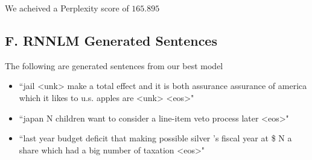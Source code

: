 \documentclass{article}
\begin{document}
We acheived a Perplexity score of $165.895$

\subsection*{F. \textbf{RNNLM} Generated Sentences }
The following are generated sentences from our best model
\begin{itemize}
\item ``jail <unk> make a total effect and it is both assurance assurance of america which it likes to u.s. apples are <unk> <eos>"
\item ``japan N children want to consider a line-item veto process later <eos>"
\item ``last year budget deficit that making possible silver 's fiscal year at \$ N a share which had a big number of taxation <eos>"
\end{itemize}
\end{document}
